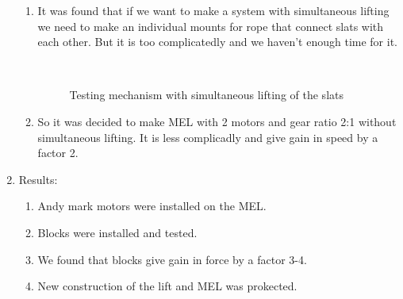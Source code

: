 \begin{enumerate}
\begin{enumerate}
        \item It was found that if we want to make a system with simultaneous lifting we need to make an individual mounts for rope that connect slats with each other. But it is too complicatedly and we haven't enough time for it. 
        \begin{figure}[H]
        	\begin{minipage}[h]{0.2\linewidth}
        		\center  
        	\end{minipage}
        	\begin{minipage}[h]{0.6\linewidth}
        		\caption{Testing mechanism with simultaneous lifting of the slats}
        	\end{minipage}
        \end{figure}
        
        \item So it was decided to make MEL with 2 motors and gear ratio 2:1 without simultaneous lifting. It is less complicadly and give gain in speed by a factor 2.

	\end{enumerate}
	
	\item Results:
	\begin{enumerate}
		
		\item Andy mark motors were installed on the MEL.
		
		\item Blocks were installed and tested.
		
		\item We found that blocks give gain in force by a factor 3-4.
		
		\item New construction of the lift and MEL was prokected.
		

\end{enumerate}
\end{enumerate}
